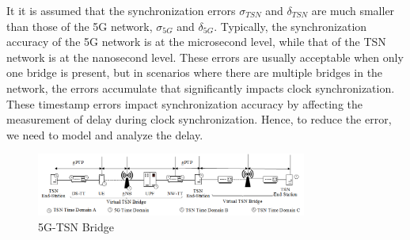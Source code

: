 \documentclass[english]{cccconf}
\begin{document}
It it is assumed that the synchronization errors $\sigma_{TSN}$ and $\delta_{TSN}$ are much smaller than those of the 5G network, $\sigma_{5G}$ and $\delta_{5G}$. Typically, the synchronization accuracy of the 5G network is at the microsecond level, while that of the TSN network is at the nanosecond level. These errors are usually acceptable when only one bridge is present, but in scenarios where there are multiple bridges in the network, the errors accumulate that significantly impacts clock synchronization. These timestamp errors impact synchronization accuracy by affecting the measurement of delay during clock synchronization. Hence, to reduce the error, we need to model and analyze the delay.
\begin{figure}[htbp]
	\centering
	\setcounter{figure}{1}
	\includegraphics[width=3.5in]{fig12.png}
	\caption{5G-TSN Bridge}
\end{figure}
\end{document}

